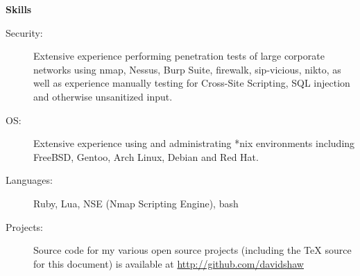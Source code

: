 \documentclass[letterpaper,11pt]{article}
\newcommand{\resheading}[1]{{\large \colorbox{mygrey}{\begin{minipage}{\textwidth}{\textbf{#1 \vphantom{p\^{E}}}}\end{minipage}}}}
\begin{document}
\resheading{{Skills}}
	\begin{description}
		\item[Security:] { \footnotesize Extensive experience performing penetration tests of large corporate networks using nmap, Nessus, Burp Suite, firewalk, sip-vicious, nikto, as well as experience manually testing for Cross-Site Scripting, SQL injection and otherwise unsanitized input.}
		\item[OS:] { \footnotesize Extensive experience using and administrating *nix environments including FreeBSD, Gentoo, Arch Linux, Debian and Red Hat.}
		\item[Languages:] { \footnotesize Ruby, Lua, NSE (Nmap Scripting Engine), bash}
		\item[Projects:] { \footnotesize Source code for my various open source projects (including the TeX source for this document) is available at \href{http://www.github.com/davidshaw}{http://github.com/davidshaw}}
	\end{description} %
\end{document}

